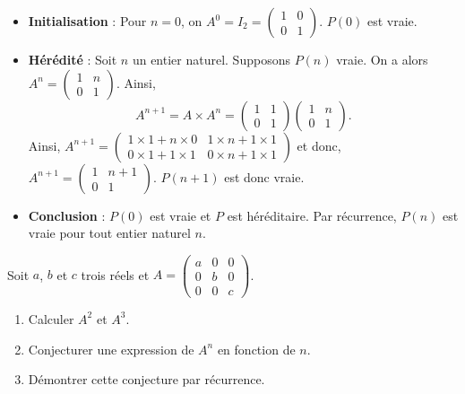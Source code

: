 \documentclass[11pt,fleqn]{book} %
\begin{document}
\begin{solution}
\begin{itemize}\item \textbf{Initialisation} : Pour \(n=0\), on \(A^0 = I_2 = \begin{pmatrix} 1&0\\0&1\end{pmatrix}\). \(P(0)\) est vraie.
	\item \textbf{Hérédité} : Soit \(n\) un entier naturel. Supposons \(P(n)\) vraie. On a alors \(A^n = \begin{pmatrix} 1 & n \\ 0 & 1\end{pmatrix}\). Ainsi,
		\[A^{n+1} = A \times A^n = \begin{pmatrix} 1 & 1 \\ 0 & 1\end{pmatrix}\begin{pmatrix} 1 & n \\ 0 & 1\end{pmatrix}.\]
		Ainsi, $A^{n+1} = \begin{pmatrix} 1 \times 1 + n \times 0 & 1 \times n +1 \times 1 \\ 0 \times 1 +1 \times 1 & 0 \times n + 1 \times 1 \end{pmatrix}$ et donc, $A^{n+1} = \begin{pmatrix} 1  & n+1  \\ 0 &  1 \end{pmatrix}$.
	 \(P(n+1)\) est donc vraie.
	\item \textbf{Conclusion} : \(P(0)\) est vraie et \(P\) est héréditaire. Par récurrence, \(P(n)\) est vraie pour tout entier  naturel \(n\).\end{itemize}\end{solution}


\begin{exercise}[topic=mat02]
\begin{minipage}{0.4\linewidth}Soit $a$, $b$ et $c$ trois réels et $A=\begin{pmatrix}a & 0 & 0 \\0 & b & 0 \\ 0 & 0 & c\end{pmatrix}$.
\end{minipage}\hfill \begin{minipage}{0.55\linewidth}
\begin{enumerate}
\item Calculer $A^2$ et $A^3$.
\item Conjecturer une expression de $A^n$ en fonction de $n$.
\item Démontrer cette conjecture par récurrence.
\end{enumerate}
\end{minipage}\end{exercise}
\end{document}
